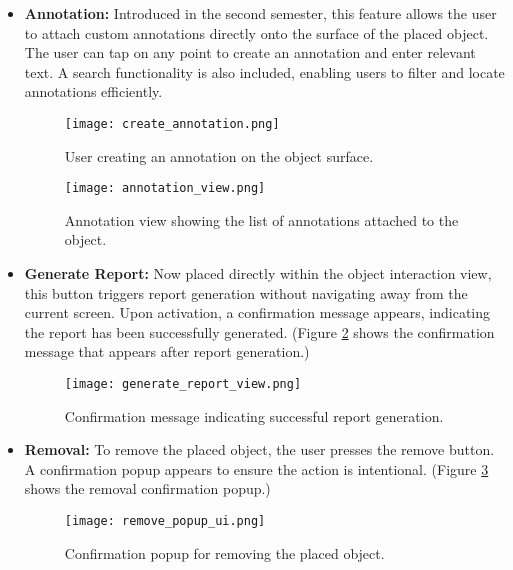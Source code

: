 \begin{itemize}
\begin{itemize}
        \item \textbf{Annotation:} Introduced in the second semester, this feature allows the user to attach custom annotations directly onto the surface of the placed object. The user can tap on any point to create an annotation and enter relevant text. A search functionality is also included, enabling users to filter and locate annotations efficiently.

        \begin{figure}[H]
            \centering
            \begin{minipage}[t]{0.48\textwidth}
                \centering
                \texttt{[image: create\_annotation.png]}
                \caption{User creating an annotation on the object surface.}
                \label{fig:create_annotation}
            \end{minipage}
            \hfill
            \begin{minipage}[t]{0.48\textwidth}
                \centering
                \texttt{[image: annotation\_view.png]}
                \caption{Annotation view showing the list of annotations attached to the object.}
                \label{fig:annotation_view}
            \end{minipage}
        \end{figure}



        \item \textbf{Generate Report:} Now placed directly within the object interaction view, this button triggers report generation without navigating away from the current screen. Upon activation, a confirmation message appears, indicating the report has been successfully generated. (Figure \ref{fig:generate_report_view} shows the confirmation message that appears after report generation.)
        \begin{figure}[H]
            \centering
            \texttt{[image: generate\_report\_view.png]}
            \caption{\centering Confirmation message indicating successful report generation.}
            \label{fig:generate_report_view}
        \end{figure}


        \item \textbf{Removal:} To remove the placed object, the user presses the remove button. A confirmation popup appears to ensure the action is intentional. (Figure \ref{fig:ui_remove_popup} shows the removal confirmation popup.)
        \begin{figure}[H]
            \centering
            \texttt{[image: remove\_popup\_ui.png]}
            \caption{Confirmation popup for removing the placed object.}
            \label{fig:ui_remove_popup}
        \end{figure}
    \end{itemize}
\end{itemize}

